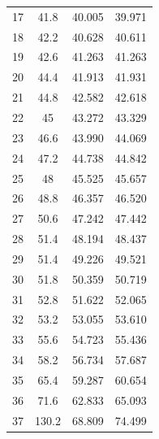 \begin{table}[H]
\begin{tabular}{cccc}
    17         & 41.8                        & 40.005                & 39.971                 \\
    18         & 42.2                        & 40.628                & 40.611                 \\
    19         & 42.6                        & 41.263                & 41.263                 \\
    20         & 44.4                        & 41.913                & 41.931                 \\
    21         & 44.8                        & 42.582                & 42.618                 \\
    22         & 45                          & 43.272                & 43.329                 \\
    23         & 46.6                        & 43.990                & 44.069                 \\
    24         & 47.2                        & 44.738                & 44.842                 \\
    25         & 48                          & 45.525                & 45.657                 \\
    26         & 48.8                        & 46.357                & 46.520                 \\
    27         & 50.6                        & 47.242                & 47.442                 \\
    28         & 51.4                        & 48.194                & 48.437                 \\
    29         & 51.4                        & 49.226                & 49.521                 \\
    30         & 51.8                        & 50.359                & 50.719                 \\
    31         & 52.8                        & 51.622                & 52.065                 \\
    32         & 53.2                        & 53.055                & 53.610                 \\
    33         & 55.6                        & 54.723                & 55.436                 \\
    34         & 58.2                        & 56.734                & 57.687                 \\
    35         & 65.4                        & 59.287                & 60.654                 \\
    36         & 71.6                        & 62.833                & 65.093                 \\
    37         & 130.2                       & 68.809                & 74.499                
    \end{tabular}
    \end{table}

